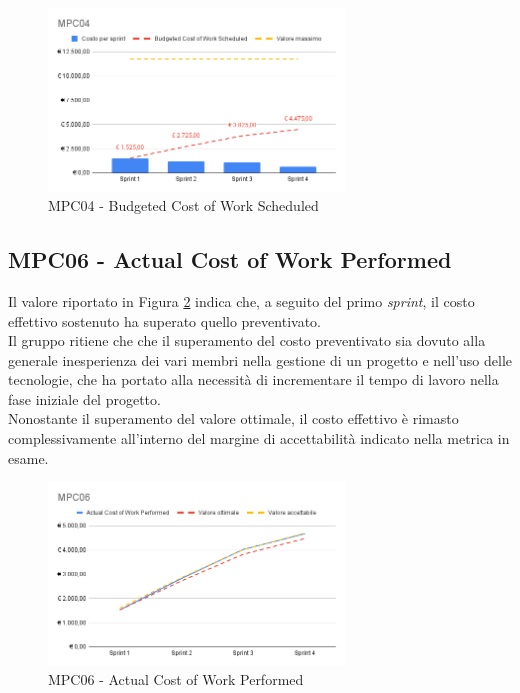 \begin{figure}[htbp]
    \centering
    \includegraphics[width=0.7\textwidth]{img/MPC04.png}
    \caption{MPC04 - Budgeted Cost of Work Scheduled}
    \label{fig:mpc04}
\end{figure}



\subsection{MPC06 - Actual Cost of Work Performed}
\label{s:mpc06}
Il valore riportato in Figura \ref{fig:mpc06} indica che, a seguito del primo \textit{sprint}, il costo effettivo sostenuto ha superato quello preventivato.\\
Il gruppo ritiene che che il superamento del costo preventivato sia dovuto alla generale inesperienza dei vari membri nella gestione di un progetto e nell'uso delle tecnologie, che ha portato alla necessità di incrementare il tempo di lavoro nella fase iniziale del progetto.\\
Nonostante il superamento del valore ottimale, il costo effettivo è rimasto complessivamente all'interno del margine di accettabilità indicato nella metrica in esame.

\begin{figure}[htbp]
    \centering
    \includegraphics[width=0.7\textwidth]{img/MPC06.png}
    \caption{MPC06 - Actual Cost of Work Performed}
    \label{fig:mpc06}
\end{figure}


